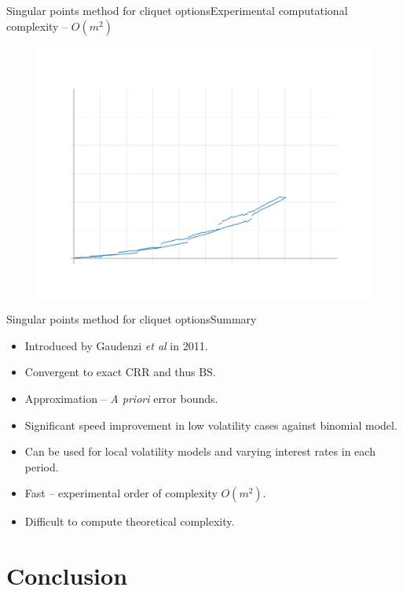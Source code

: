 \documentclass[utf8,t,compress,xcolor=svgnames,handout]{beamer}
\newcommand\pro{\item[\textbf{\CheckedBox}]}
\newcommand\con{\item[\textbf{\XBox}]}
\newcommand\neu{\item[\textbf{\Square}]}
\begin{document}
	
	\begin{frame}{Singular points method for cliquet options}{Experimental computational complexity -- $ O(m^2) $}
		\begin{figure}
			\centering
			\includegraphics[width=0.85\linewidth]{../img/timing-cliquet}
		\end{figure}
	\end{frame}
	
	
	\begin{frame}{Singular points method for cliquet options}{Summary}
		\begin{itemize}
			\neu Introduced by Gaudenzi \emph{et al} \cite{Gaudenzi2011} in 2011.
			\pro Convergent to exact CRR and thus BS.
			\pro Approximation -- \emph{A priori} error bounds.
			\pro Significant speed improvement in low volatility cases against binomial model.
			\pro<alert@1-> Can be used for local volatility models and varying interest rates in each period.
			\pro<alert@1-> Fast -- experimental order of complexity $ O(m^2) $.
			\con Difficult to compute theoretical complexity.
		\end{itemize}
	\end{frame}
	
	
	\section{Conclusion}
	
\end{document}

